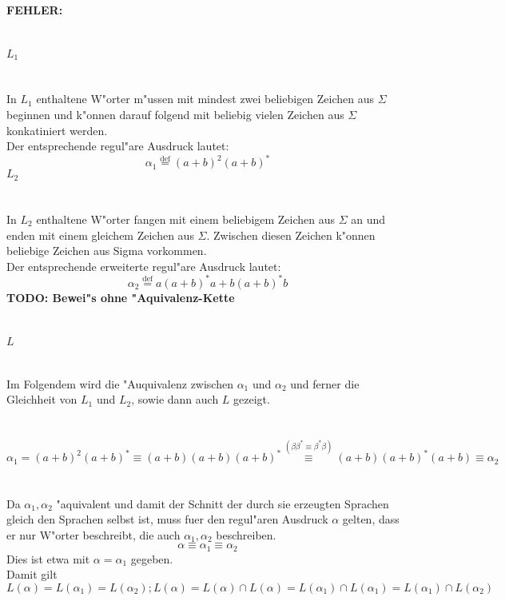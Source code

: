 \documentclass{article}
\newcommand{\gap}{\null\ \\ \\}
\newcommand{\task}[1]{\textbf{#1} \\ \gap}
\newcommand{\error}{\task{FEHLER:}}
\newcommand{\mdef}{\overset{\text{def}}{=}}
\begin{document}
\error
\task{$L_1$}
In $L_1$ enthaltene W"orter m"ussen mit mindest zwei beliebigen Zeichen aus 
    $\Sigma$ beginnen und k"onnen darauf folgend mit beliebig vielen
    Zeichen aus $\Sigma$ konkatiniert werden.\\
Der entsprechende regul"are Ausdruck lautet:\[
    \alpha_1 \mdef (a+b)^2 (a+b)^*
    \]
\task{$L_2$}
In $L_2$ enthaltene W"orter fangen mit einem beliebigem Zeichen aus $\Sigma$ an
    und enden mit einem gleichem Zeichen aus $\Sigma$. Zwischen diesen Zeichen
    k"onnen beliebige Zeichen aus Sigma vorkommen.\\
Der entsprechende erweiterte regul"are Ausdruck lautet:\[
    \alpha_2 \mdef a(a+b)^*a + b(a+b)^*b
    \]
\task{TODO: Bewei"s ohne "Aquivalenz-Kette}
\task{$L$}
Im Folgendem wird die "Auquivalenz zwischen $\alpha_1$ und $\alpha_2$ und ferner
    die Gleichheit von $L_1$ und $L_2$, sowie dann auch $L$ gezeigt.\\
\gap
\[
    \alpha_1 = (a+b)^2(a+b)^*
        \equiv (a+b)(a+b)(a+b)^*
        \overset{{(\beta \beta^* \equiv \beta^* \beta)}}{\equiv}
            (a+b)(a+b)^*(a+b)
        \equiv \alpha_2
    \]
\gap
Da $\alpha_1,\alpha_2$ "aquivalent und damit der Schnitt der durch sie erzeugten
    Sprachen gleich den Sprachen selbst ist, muss
    fuer den regul"aren Ausdruck $\alpha$ gelten, dass er nur W"orter
    beschreibt, die auch $\alpha_1,\alpha_2$ beschreiben.\[
    \alpha \equiv \alpha_1 \equiv \alpha_2
    \]
Dies ist etwa mit $\alpha = \alpha_1$ gegeben.\\
Damit gilt \[
    L(\alpha) = L(\alpha_1) = L(\alpha_2);
    L(\alpha )= L(\alpha) \cap L(\alpha)
        = L(\alpha_1) \cap L(\alpha_1)
        = L(\alpha_1) \cap L(\alpha_2) 
    \]
\end{document}
